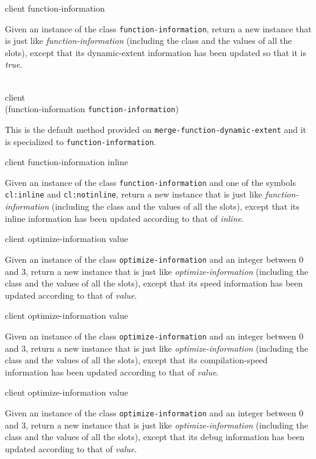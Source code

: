  {client function-information}

Given an instance of the class \texttt{function-information}, return a
new instance that is just like \textit{function-information}
(including the class and the values of all the slots), except that its
dynamic-extent information has been updated so that it is \emph{true}.

\\
           {client\\
            (function-information {\tt function-information})}

This is the default method provided on
\texttt{merge-function-dynamic-extent} and it is specialized to
\texttt{function-information}.

 {client function-information inline}

Given an instance of the class \texttt{function-information} and one
of the symbols \texttt{cl:inline} and \texttt{cl:notinline},
return a new instance that is just like
\textit{function-information} (including the class and the values of
all the slots), except that its inline information has been updated
according to that of \textit{inline}.

 {client optimize-information value}

Given an instance of the class \texttt{optimize-information} and an
integer between $0$ and $3$, return a new instance that is just like
\textit{optimize-information} (including the class and the values of
all the slots), except that its speed information has been updated
according to that of \textit{value}.

 {client optimize-information value}

Given an instance of the class \texttt{optimize-information} and an
integer between $0$ and $3$, return a new instance that is just like
\textit{optimize-information} (including the class and the values of
all the slots), except that its compilation-speed information has been
updated according to that of \textit{value}.

 {client optimize-information value}

Given an instance of the class \texttt{optimize-information} and an
integer between $0$ and $3$, return a new instance that is just like
\textit{optimize-information} (including the class and the values of
all the slots), except that its debug information has been updated
according to that of \textit{value}.

